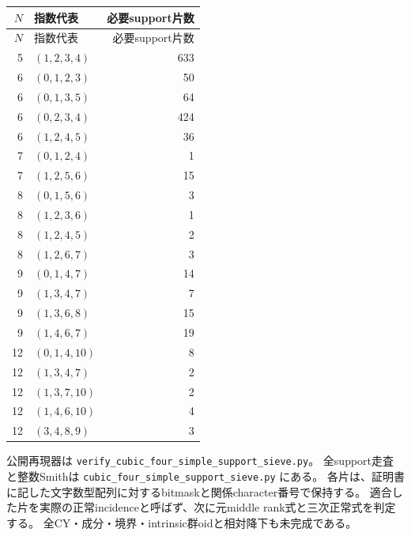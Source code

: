 \begin{center}
\begin{longtable}{r l r}
\toprule
$N$&指数代表&必要support片数\\\midrule
\endfirsthead
\toprule $N$&指数代表&必要support片数\\\midrule
\endhead
5&$(1,2,3,4)$&633\\
6&$(0,1,2,3)$&50\\
6&$(0,1,3,5)$&64\\
6&$(0,2,3,4)$&424\\
6&$(1,2,4,5)$&36\\
7&$(0,1,2,4)$&1\\
7&$(1,2,5,6)$&15\\
8&$(0,1,5,6)$&3\\
8&$(1,2,3,6)$&1\\
8&$(1,2,4,5)$&2\\
8&$(1,2,6,7)$&3\\
9&$(0,1,4,7)$&14\\
9&$(1,3,4,7)$&7\\
9&$(1,3,6,8)$&15\\
9&$(1,4,6,7)$&19\\
12&$(0,1,4,10)$&8\\
12&$(1,3,4,7)$&2\\
12&$(1,3,7,10)$&2\\
12&$(1,4,6,10)$&4\\
12&$(3,4,8,9)$&3\\
\bottomrule
\end{longtable}
\end{center}

公開再現器は \texttt{verify\_cubic\_four\_simple\_support\_sieve.py}。
全support走査と整数Smithは \texttt{cubic\_four\_simple\_support\_sieve.py} にある。
各片は、証明書に記した文字数型配列に対するbitmaskと関係character番号で保持する。
適合した片を実際の正常incidenceと呼ばず、次に元middle rank式と三次正常式を判定する。
全CY・成分・境界・intrinsic群oidと相対降下も未完成である。
